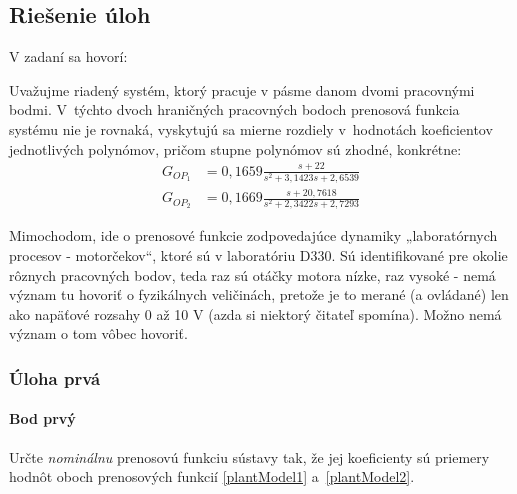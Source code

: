 \documentclass[a4paper, 10pt, ]{article}
\begin{document}
\subsection{Riešenie úloh}



V zadaní sa hovorí:

\smallskip

{\color{gray}

\noindent
Uvažujme riadený systém, ktorý pracuje v pásme danom dvomi pracovnými bodmi. V~týchto dvoch hraničných pracovných bodoch prenosová funkcia systému nie je rovnaká, vyskytujú sa mierne rozdiely v~hodnotách koeficientov jednotlivých polynómov, pričom stupne polynómov sú zhodné, konkrétne:
\begin{align*}
    G_{OP_1} &= 0,1659 \frac{s + 22}{ s^2 + 3,1423 s + 2,6539} 	\\
    G_{OP_2} &= 0,1669 \frac{s + 20,7618}{s^2 + 2,3422s + 2,7293}
\end{align*}

}

\smallskip

Mimochodom, ide o prenosové funkcie zodpovedajúce dynamiky „laboratórnych procesov - motorčekov“, ktoré sú v laboratóriu D330. Sú identifikované pre okolie rôznych pracovných bodov, teda raz sú otáčky motora nízke, raz vysoké - nemá význam tu hovoriť o fyzikálnych veličinách, pretože je to merané (a ovládané) len ako napäťové rozsahy 0 až 10 V (azda si niektorý čitateľ spomína). Možno nemá význam o tom vôbec hovoriť.



\subsubsection{Úloha prvá}


\paragraph{Bod prvý}


\smallskip

{\color{gray}

Určte \emph{nominálnu} prenosovú funkciu sústavy tak, že jej koeficienty sú priemery hodnôt oboch prenosových funkcií \eqref{plantModel1} a~\eqref{plantModel2}.

}
\end{document}

